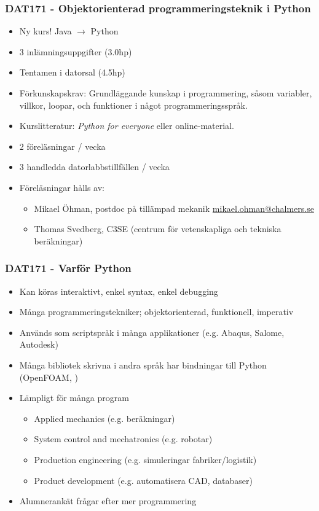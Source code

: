 \documentclass{beamer}
\begin{document}
\begin{frame}
\frametitle{DAT171 - Objektorienterad programmeringsteknik i Python}
\begin{itemize}
 \item Ny kurs! Java $\to$ Python
 \item 3 inlämningsuppgifter     (3.0hp)
 \item Tentamen i datorsal       (4.5hp)
 \item Förkunskapskrav: Grundläggande kunskap i programmering, såsom variabler, villkor, loopar, och funktioner i något programmeringsspråk.
 \item Kurslitteratur: \textit{Python for everyone} eller online-material.
 \item 2 föreläsningar / vecka
 \item 3 handledda datorlabbstillfällen / vecka
 \item Föreläsningar hålls av:
 \begin{itemize}
  \item Mikael Öhman, postdoc på tillämpad mekanik \url{mikael.ohman@chalmers.se}
  \item Thomas Svedberg, C3SE (centrum för vetenskapliga och tekniska beräkningar)
 \end{itemize}
\end{itemize}
\end{frame}

\begin{frame}
\frametitle{DAT171 - Varför Python}
\begin{itemize}
 \item Kan köras interaktivt, enkel syntax, enkel debugging
 \item Många programmeringstekniker; objektorienterad, funktionell, imperativ
 \item Används som scriptspråk i många applikationer (e.g. Abaqus, Salome, Autodesk)
 \item Många bibliotek skrivna i andra språk har bindningar till Python (OpenFOAM, )
 \item Lämpligt för många program
 \begin{itemize}
 \item Applied mechanics (e.g. beräkningar)
 \item System control and mechatronics (e.g. robotar)
 \item Production engineering (e.g. simuleringar fabriker/logistik)
 \item Product development (e.g. automatisera CAD, databaser)
 \end{itemize}
 \item Alumnerankät frågar efter mer programmering
\end{itemize}
\end{frame}
\end{document}
